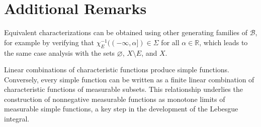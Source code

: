 \documentclass{article}
\newcommand{\R}{\mathbb{R}}
\newcommand{\B}{\mathcal{B}}
\newcommand{\Sig}{\Sigma}
\begin{document}
\section*{Additional Remarks}

\begin{remark}
  Equivalent characterizations can be obtained using other generating families
  of $\B$, for example by verifying that $\chi_E^{- 1} ((- \infty, \alpha])
  \in \Sig$ for all $\alpha \in \R$, which leads to the same case analysis
  with the sets $\varnothing$, $X \setminus E$, and $X$.
\end{remark}

\begin{remark}
  Linear combinations of characteristic functions produce simple functions.
  Conversely, every simple function can be written as a finite linear
  combination of characteristic functions of measurable subsets. This
  relationship underlies the construction of nonnegative measurable functions
  as monotone limits of measurable simple functions, a key step in the
  development of the Lebesgue integral.
\end{remark}
\end{document}
